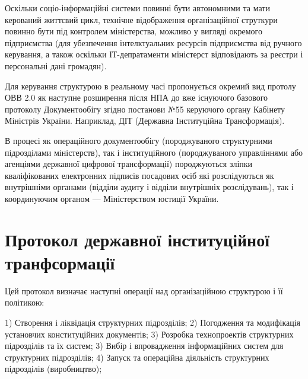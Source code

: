 Оскільки соціо-інформаційні системи повинні бути автономними та мати
керований життєвий цикл, технічне відображення організаційної струткури
повинно бути під контролем міністерства, можливо у вигляді окремого
підприємства (для убезпечення інтелктуальних ресурсів підприємства
від ручного керування, а також оскільки ІТ-депратаменти міністерст
відповідають за реєстри і персональні дані громадян).

Для керування структурою в реальному часі пропонується окремий вид
протолу ОВВ 2.0 як наступне розширення після НПА до вже існуючого
базового протоколу Документообігу згідно постанови №55 керуючого
органу Кабінету Міністрів України. Наприклад, ДІТ (Державна
Інституційна Трансформація).

В процесі як операційного документообігу (породжуваного структурними
підрозділами міністерств), так і інституційного (породжуваного управліннями
або агенціями державної цифрової трансформації) породжуються зліпки кваліфікованих
електронних підписів посадових осіб які розслідуються як внутрішніми
органами (відділи аудиту і відділи внутрішніх розслідувань), так і
координуючим органом — Міністерством юстиції України.

\section{Протокол державної інституційної транфсормації}

Цей протокол визначає наступні операції над організаційною структурою і її політикою:

1) Створення і ліквідація структурних підрозділів;
2) Погодження та модифікація установчих конституційних документів;
3) Розробка технопроектів структурних підрозділів та їх систем;
3) Вибір і впровадження інформаційних систем для структурних підрозділів;
4) Запуск та операційна діяльність структурних підрозділів (виробництво);

